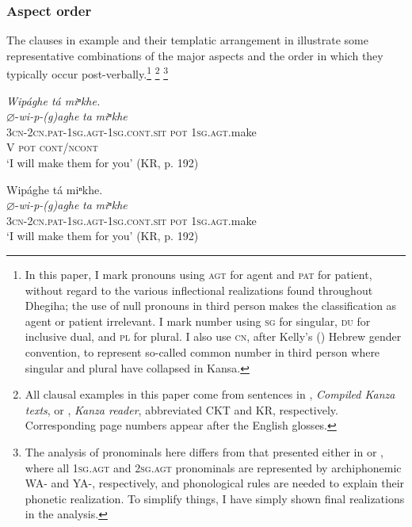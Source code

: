 \documentclass[output=paper]{LSP/langsci}
\begin{document}
\subsubsection{Aspect order} 

The clauses in example  and their templatic arrangement in  illustrate some representative combinations of the major aspects and the order in which they typically occur post-verbally.\footnote{In this paper, I mark pronouns using \textsc{agt} for agent and \textsc{pat} for patient, without regard to the various inflectional
realizations found throughout Dhegiha; the use of null pronouns in third person makes the classification as agent or patient irrelevant. I mark number using \textsc{sg} for singular, \textsc{du} for inclusive dual, and \textsc{pl} for plural. I also use \textsc{cn}, after Kelly's (\citeyear{Kelly1992}) Hebrew gender convention, to represent so-called common number in third person where singular and plural have collapsed in Kansa.} \footnote{All clausal examples in this paper come from sentences in  \citet{McBrideCumberland2009}, \textit{Compiled Kanza texts}, or \citet{McBrideCumberland2010}, \textit{Kanza reader}, abbreviated CKT and KR, respectively. Corresponding page numbers appear after the English glosses.} \footnote{The analysis of pronominals here differs from that presented either in \citet{Quintero2004} or \citet{Rankin2005}, where all \textsc{1sg.agt} and \textsc{2sg.agt} pronominals are represented by archiphonemic WA- and YA-, respectively, and phonological rules are needed to explain their phonetic realization. To simplify things, I have simply shown final realizations in the analysis.}

\ea
{\itshape Wip\'aghe t\'a miⁿkhe.}\\ 
\glll 
$\varnothing$-\textit{wi-p-(g)aghe}  \textit{ta}  \textit{miⁿkhe} \\
 \textsc{3cn-2cn.pat-1sg.agt-1sg.cont.sit}   \textsc{pot}   \textsc{1sg.agt}.make \\
V \textsc{pot}   \textsc{cont/ncont} \\
\glt  `I will make them for you' (KR, p. 192) \\
\z


\ea\label{postverbalorder}

\ea\label{postverbalorder1}{Wip\'aghe t\'a miⁿkhe.\\ 
\gll
$\varnothing$-\textit{wi-p-(g)aghe}  \textit{ta}  \textit{miⁿkhe} \\
 \textsc{3cn-2cn.pat-1sg.agt-1sg.cont.sit}   \textsc{pot}   \textsc{1sg.agt}.make \\
\glt  `I will make them for you' (KR, p. 192) \\
}
\end{document}
